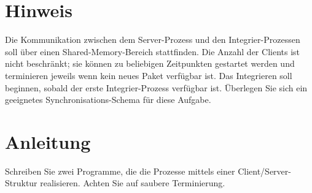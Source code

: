 \section*{Hinweis}
Die Kommunikation zwischen dem Server-Prozess und den Integrier-Prozessen soll
über einen Shared-Memory-Bereich stattfinden. Die Anzahl der Clients ist nicht
beschränkt; sie können zu beliebigen Zeitpunkten gestartet werden und
terminieren jeweils wenn kein neues Paket verfügbar ist. Das Integrieren soll
beginnen, sobald der erste Integrier-Prozess verfügbar ist. Überlegen Sie sich
ein geeignetes Synchronisations-Schema für diese Aufgabe.

\section*{Anleitung}
Schreiben Sie zwei Programme, die die Prozesse mittels einer
Client/Server-Struktur realisieren. Achten Sie auf saubere Terminierung.

\osueguidelinesthree



